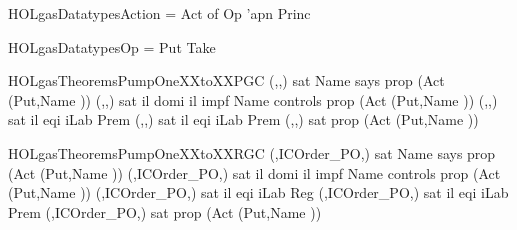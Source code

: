 \newcommand{\HOLgasDate}{28 July 2013}
\newcommand{\HOLgasTime}{16:26}
\begin{SaveVerbatim}{HOLgasDatatypesAction}
 = Act of Op \HOLTokenProd{} 'apn Princ
\end{SaveVerbatim}
\newcommand{\HOLgasDatatypesAction}{\UseVerbatim{HOLgasDatatypesAction}}
\begin{SaveVerbatim}{HOLgasDatatypesOp}
 = Put \HOLTokenBar{} Take
\end{SaveVerbatim}
\newcommand{\HOLgasDatatypesOp}{\UseVerbatim{HOLgasDatatypesOp}}
\newcommand{\HOLgasDatatypes}{
\HOLgasDatatypesAction\HOLgasDatatypesOp}
\begin{SaveVerbatim}{HOLgasTheoremsPumpOneXXtoXXPGC}
\HOLTokenTurnstile{} (,,) sat Name  says prop (Act (Put,Name )) \HOLTokenImp{}
   (,,) sat
   il  domi il  impf
   Name  controls prop (Act (Put,Name )) \HOLTokenImp{}
   (,,) sat il  eqi iLab Prem \HOLTokenImp{}
   (,,) sat il  eqi iLab Prem \HOLTokenImp{}
   (,,) sat prop (Act (Put,Name ))
\end{SaveVerbatim}
\newcommand{\HOLgasTheoremsPumpOneXXtoXXPGC}{\UseVerbatim{HOLgasTheoremsPumpOneXXtoXXPGC}}
\begin{SaveVerbatim}{HOLgasTheoremsPumpOneXXtoXXRGC}
\HOLTokenTurnstile{} (,ICOrder_PO,) sat
   Name  says prop (Act (Put,Name )) \HOLTokenImp{}
   (,ICOrder_PO,) sat
   il  domi il  impf
   Name  controls prop (Act (Put,Name )) \HOLTokenImp{}
   (,ICOrder_PO,) sat il  eqi iLab Reg \HOLTokenImp{}
   (,ICOrder_PO,) sat il  eqi iLab Prem \HOLTokenImp{}
   (,ICOrder_PO,) sat prop (Act (Put,Name ))
\end{SaveVerbatim}
\newcommand{\HOLgasTheoremsPumpOneXXtoXXRGC}{\UseVerbatim{HOLgasTheoremsPumpOneXXtoXXRGC}}
\newcommand{\HOLgasTheorems}{
\HOLThmTag{gas}{Pump1_to_PGC}\HOLgasTheoremsPumpOneXXtoXXPGC
\HOLThmTag{gas}{Pump1_to_RGC}\HOLgasTheoremsPumpOneXXtoXXRGC
}
